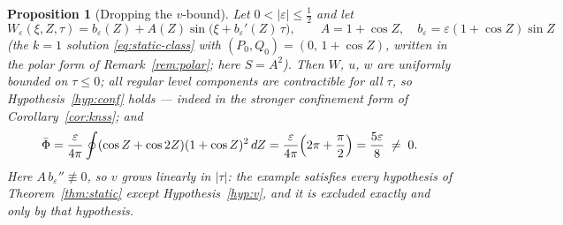 \documentclass[11pt]{amsart}
\newtheorem{proposition}[theorem]{Proposition}
\theoremstyle{definition}
\theoremstyle{remark}
\newcommand{\Fbar}{\bar\Phi}
\begin{document}
\begin{proposition}[Dropping the $v$-bound]\label{prop:counterexample}
Let $0<|\varepsilon|\le\tfrac12$ and let
\[
  W_\varepsilon(\xi,Z,\tau)
  =b_\varepsilon(Z)+A(Z)\sin\bigl(\xi+b_\varepsilon'(Z)\,\tau\bigr),
  \qquad A=1+\cos Z,\quad b_\varepsilon=\varepsilon(1+\cos Z)\sin Z
\]
(the $k=1$ solution \eqref{eq:static-class} with
$(P_0,Q_0)=(0,\,1+\cos Z)$, written in the polar form of
Remark~\ref{rem:polar}; here $S=A^2$). Then $W$, $u$, $w$ are uniformly
bounded on $\tau\le0$; all regular level components are contractible
for all $\tau$, so Hypothesis~\ref{hyp:conf} holds --- indeed in the
stronger confinement form of Corollary~\ref{cor:knss}; and
\[
  \Fbar=\frac{\varepsilon}{4\pi}\oint(\cos Z+\cos2Z)(1+\cos Z)^2\,dZ
  =\frac{\varepsilon}{4\pi}\Bigl(2\pi+\frac{\pi}2\Bigr)
  =\frac{5\varepsilon}{8}\;\neq\;0 .
\]
Here $A\,b_\varepsilon''\not\equiv0$, so $v$ grows linearly in
$|\tau|$: the example satisfies every hypothesis of
Theorem~\ref{thm:static} except Hypothesis~\ref{hyp:v}, and it is
excluded exactly and only by that hypothesis.
\end{proposition}
\end{document}
